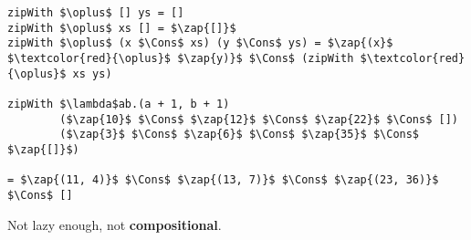 \begin{frame}[t,fragile]
\vspace{35pt}


\begin{lstlisting}[mathescape=true,numbers=none]
zipWith $\oplus$ [] ys = []
zipWith $\oplus$ xs [] = $\zap{[]}$
zipWith $\oplus$ (x $\Cons$ xs) (y $\Cons$ ys) = $\zap{(x}$ $\textcolor{red}{\oplus}$ $\zap{y)}$ $\Cons$ (zipWith $\textcolor{red}{\oplus}$ xs ys)

zipWith $\lambda$ab.(a + 1, b + 1)
        ($\zap{10}$ $\Cons$ $\zap{12}$ $\Cons$ $\zap{22}$ $\Cons$ [])
        ($\zap{3}$ $\Cons$ $\zap{6}$ $\Cons$ $\zap{35}$ $\Cons$ $\zap{[]}$)

= $\zap{(11, 4)}$ $\Cons$ $\zap{(13, 7)}$ $\Cons$ $\zap{(23, 36)}$ $\Cons$ []
\end{lstlisting}

\vspace{5pt}
Not lazy enough, not \textbf{compositional}.

\end{frame}
